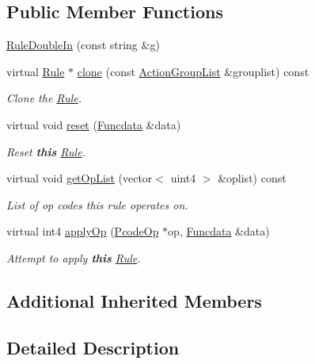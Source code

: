 \subsection*{Public Member Functions}
\begin{DoxyCompactItemize}
\item 
\mbox{\hyperlink{class_rule_double_in_ace25959904b763dd17431587447598ab}{Rule\+Double\+In}} (const string \&g)
\item 
virtual \mbox{\hyperlink{class_rule}{Rule}} $\ast$ \mbox{\hyperlink{class_rule_double_in_a43626154c6e567ac9b235f4f9c05439d}{clone}} (const \mbox{\hyperlink{class_action_group_list}{Action\+Group\+List}} \&grouplist) const
\begin{DoxyCompactList}\small\item\em Clone the \mbox{\hyperlink{class_rule}{Rule}}. \end{DoxyCompactList}\item 
virtual void \mbox{\hyperlink{class_rule_double_in_a9feb1ec4c3183551094c745c169ee14e}{reset}} (\mbox{\hyperlink{class_funcdata}{Funcdata}} \&data)
\begin{DoxyCompactList}\small\item\em Reset {\bfseries{this}} \mbox{\hyperlink{class_rule}{Rule}}. \end{DoxyCompactList}\item 
virtual void \mbox{\hyperlink{class_rule_double_in_a4c7fdd07d59db8f10a120c8e4d839d9b}{get\+Op\+List}} (vector$<$ uint4 $>$ \&oplist) const
\begin{DoxyCompactList}\small\item\em List of op codes this rule operates on. \end{DoxyCompactList}\item 
virtual int4 \mbox{\hyperlink{class_rule_double_in_acde0bde06644b6bf122d096fccfb082f}{apply\+Op}} (\mbox{\hyperlink{class_pcode_op}{Pcode\+Op}} $\ast$op, \mbox{\hyperlink{class_funcdata}{Funcdata}} \&data)
\begin{DoxyCompactList}\small\item\em Attempt to apply {\bfseries{this}} \mbox{\hyperlink{class_rule}{Rule}}. \end{DoxyCompactList}\end{DoxyCompactItemize}
\subsection*{Additional Inherited Members}


\subsection{Detailed Description}


